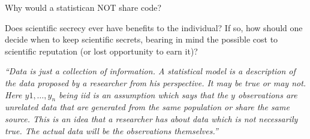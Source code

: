 \documentclass[portrait,11pt]{seminar}
\begin{document}



\es
\bs Why would a statistican NOT share code? 

\vspace{3cm}

Does scientific secrecy ever have benefits to the individual? If so, how should one decide when to keep scientific secrets, bearing in mind the possible cost to scientific reputation (or lost opportunity to earn it)?

\es



{\it ``Data is just a collection of information. A statistical model is a description of the data proposed by a researcher from his perspective. It may be true or may not. Here $y1,\dots,y_n$ being iid is an assumption which says that the $y$ observations are unrelated data that are generated from the same population or share the same source. This is an idea that a researcher has about data which is not necessarily true. The actual data will be the observations themselves.''}





\end{document}
